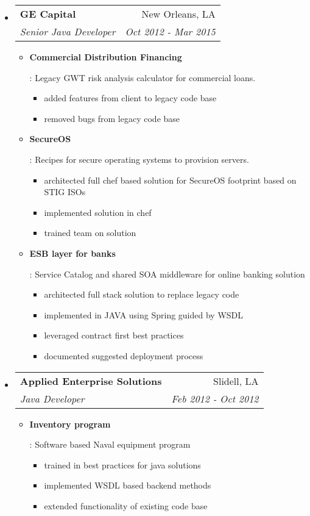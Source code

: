 \documentclass[letterpaper, 10pt]{extarticle}
\makeatletter
\newcommand{\resumeItem}[2]{
\item\small{
    \textbf{#1}{: #2 \vspace{-2pt}}
  }
}
\newcommand{\resumeSubheading}[4]{
  \vspace{-1pt}\item{
    \begin{tabular*}{0.97\textwidth}{l@{\extracolsep{\fill}}r}
      \textbf{#1} & #2 \\
      \textit{\small#3} & \textit{\small #4} \\
    \end{tabular*}\vspace{-5pt}}
}
\newcommand{\resumeSubHeadingListStart}{\begin{itemize}[leftmargin=*]}
\newcommand{\resumeSubHeadingListEnd}{\end{itemize}}
\newcommand{\resumeItemListStart}{\justify\begin{itemize}}
\newcommand{\resumeItemListEnd}{\end{itemize}\vspace{-5pt}}
\makeatother
\begin{document}
\resumeSubHeadingListStart
\resumeSubheading
{GE Capital}{New Orleans, LA}
{Senior Java Developer}{Oct 2012 - Mar 2015}
\resumeItemListStart
\resumeItem{Commercial Distribution Financing}
{Legacy GWT risk analysis calculator for commercial loans.

  \begin{itemize}
    \item added features from client to legacy code base
    \item removed bugs from legacy code base
  \end{itemize}

}

\resumeItem{SecureOS}
{Recipes for secure operating systems to provision servers.

  \begin{itemize}
    \item architected full chef based solution for SecureOS footprint based on STIG ISOs
    \item implemented solution in chef
    \item trained team on solution
  \end{itemize}

}

\resumeItem{ESB layer for banks}
{Service Catalog and shared SOA middleware for online banking solution

  \begin{itemize}
    \item architected full stack solution to replace legacy code
    \item implemented in JAVA using Spring guided by WSDL
    \item leveraged contract first best practices
    \item documented suggested deployment process
  \end{itemize}

}
\resumeItemListEnd
\resumeSubHeadingListEnd

\resumeSubHeadingListStart
\resumeSubheading
{Applied Enterprise Solutions}{Slidell, LA}
{Java Developer}{Feb 2012 - Oct 2012}
\resumeItemListStart
\resumeItem{Inventory program}
{Software based Naval equipment program

  \begin{itemize}
    \item trained in best practices for java solutions
    \item implemented WSDL based backend methods
    \item extended functionality of existing code base
  \end{itemize}

}
\resumeItemListEnd
\resumeSubHeadingListEnd
\end{document}
